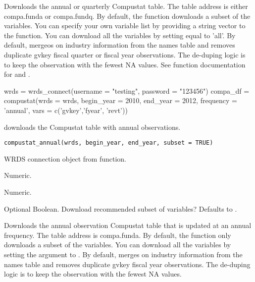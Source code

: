 \documentclass[a4paper]{book}
\begin{document}
%
\begin{Details}\relax
Downloads the annual or quarterly Compustat table. The table address is either compa.funda or
compa.fundq. By default, the function downloads a subset of the variables. You can specify your
own variable list by providing a string vector to the  function. You can download all
the variables by setting  equal to 'all'.  By default, mergeos on industry
information from the names table and removes duplicate gvkey fiscal quarter or
fiscal year observations. The de-duping logic is to keep the observation with the fewest NA
values. See function documentation for  and .
\end{Details}
%
\begin{Examples}
\begin{ExampleCode}
wrds = wrds_connect(username = "testing", password = "123456")
compa_df = compustat(wrds = wrds, begin_year = 2010, end_year = 2012, frequency = 'annual', vars = c('gvkey','fyear', 'revt'))
\end{ExampleCode}
\end{Examples}
%
\begin{Description}\relax
{} downloads the Compustat table with annual observations.
\end{Description}
%
\begin{Usage}
\begin{verbatim}
compustat_annual(wrds, begin_year, end_year, subset = TRUE)
\end{verbatim}
\end{Usage}
%
\begin{Arguments}
\begin{ldescription}
\item[\code{wrds}] WRDS connection object from  function.

\item[\code{begin\_year}] Numeric.

\item[\code{end\_year}] Numeric.

\item[\code{subset}] Optional Boolean. Download recommended subset of variables? Defaults to .
\end{ldescription}
\end{Arguments}
%
\begin{Details}\relax
Downloads the annual observation Compustat table that is updated at an annual frequency. The
table address is compa.funda. By default, the function only downloads a subset of the variables.
You can download all the variables by setting the  argument to .
By default, merges on industry information from the names table and removes duplicate gvkey
fiscal year observations. The de-duping logic is to keep the observation with the fewest NA
values.
\end{Details}
\end{document}

